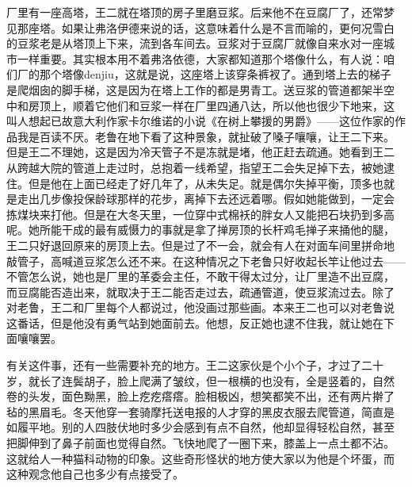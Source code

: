 厂里有一座高塔，王二就在塔顶的房子里磨豆浆。后来他不在豆腐厂了，还常梦
见那座塔。如果让弗洛伊德来说的话，这意味着什么是不言而喻的，更何况雪白
的豆浆老是从塔顶上下来，流到各车间去。豆浆对于豆腐厂就像自来水对一座城
市一样重要。其实根本用不着弗洛依德，大家都知道那个塔像什么，有人说：咱
们厂的那个塔像denjiu，这就是说，这座塔上该穿条裤衩了。通到塔上去的梯子
是爬烟囱的脚手梯，这是因为在塔上工作的都是男青工。送豆浆的管道都架半空
中和房顶上，顺着它他们和豆浆一样在厂里四通八达，所以他也很少下地来，这
叫人想起已故意大利作家卡尔维诺的小说《在树上攀援的男爵》——这位作家的作
品我是百读不厌。老鲁在地下看了这种景象，就扯破了嗓子嚷嚷，让王二下来。
但是王二不理她，这是因为冷天管子不是冻就是堵，他正赶去疏通。她看到王二
从跨越大院的管道上走过时，总抱着一线希望，指望王二会失足掉下去，被她逮
住。但是他在上面已经走了好几年了，从未失足。就是偶尔失掉平衡，顶多也就
是走出几步像投保龄球那样的花步，离掉下去还远着哪。假如她能做到，一定会
拣煤块来打他。但是在大冬天里，一位穿中式棉袄的胖女人又能把石块扔到多高
呢。她所能干成的最有威慑力的事就是拿了掸房顶的长杆鸡毛掸子来捅他的腿，
王二只好退回原来的房顶上去。但是过了不一会，就会有人在对面车间里拼命地
敲管子，高喊道豆浆怎么还不来。在这种情况之下老鲁只好收起长竿让他过去——
不管怎么说，她也是厂里的革委会主任，不敢干得太过分，让厂里造不出豆腐，
而豆腐能否造出来，就取决于王二能否走过去，疏通管道，使豆浆流过去。除了
对老鲁，王二和厂里每个人都说过，他没画过那些画。本来王二也可以对老鲁说
这番话，但是他没有勇气站到她面前去。他想，反正她也逮不住我，就让她在下
面嚷嚷罢。

有关这件事，还有一些需要补充的地方。王二这家伙是个小个子，才过了二十
岁，就长了连鬓胡子，脸上爬满了皱纹，但一根横的也没有，全是竖着的，自然
卷的头发，面色黝黑，脸上疙疙瘩瘩。脸相极凶，想笑都笑不出，还有两片擀了
毡的黑眉毛。冬天他穿一套骑摩托送电报的人才穿的黑皮衣服去爬管道，简直是
如履平地。别的人四肢伏地时多少会感到有点不自然，他却显得轻松自然，甚至
把脚伸到了鼻子前面也觉得自然。飞快地爬了一圈下来，膝盖上一点土都不沾。
这就给人一种猫科动物的印象。这些奇形怪状的地方使大家以为他是个坏蛋，而
这种观念他自己也多少有点接受了。


